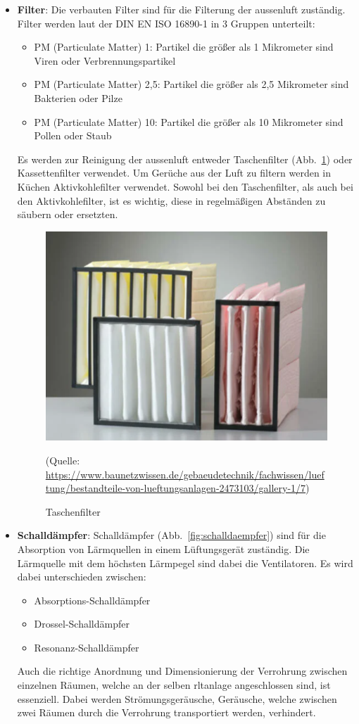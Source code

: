 \begin{itemize}
\item \textbf{Filter}: Die verbauten Filter sind für die Filterung der \gls{aussenluft} zuständig. Filter werden laut der DIN EN ISO 16890-1 in 3 Gruppen unterteilt:
\begin{itemize}
	\item PM (Particulate Matter) 1: Partikel die größer als 1 Mikrometer sind \zB Viren oder Verbrennungspartikel 
	\item PM (Particulate Matter) 2,5: Partikel die größer als 2,5 Mikrometer sind \zB Bakterien oder Pilze
	\item PM (Particulate Matter) 10: Partikel die größer als 10 Mikrometer sind \zB Pollen oder Staub
\end{itemize}
Es werden zur Reinigung der \gls{aussenluft} entweder Taschenfilter (Abb.~\ref{fig:taschenfilter}) oder Kassettenfilter verwendet. Um Gerüche aus der Luft zu filtern \zB werden in Küchen Aktivkohlefilter verwendet. Sowohl bei den Taschenfilter, als auch bei den Aktivkohlefilter, ist es wichtig, diese in regelmäßigen Abständen zu säubern oder ersetzten.  

\begin{figure}[H]
	\centering
	\includegraphics[width=0.4\linewidth]{Bilder/normalefilter}
	\caption{Taschenfilter} 
	(Quelle: \url{	https://www.baunetzwissen.de/gebaeudetechnik/fachwissen/lueftung/bestandteile-von-lueftungsanlagen-2473103/gallery-1/7})
	\label{fig:taschenfilter}
\end{figure}

	\item \textbf{Schalldämpfer}: Schalldämpfer (Abb.~\ref{fig:schalldaempfer}) sind für die Absorption von Lärmquellen in einem Lüftungsgerät zuständig. Die Lärmquelle mit dem höchsten Lärmpegel sind dabei die Ventilatoren. Es wird dabei unterschieden zwischen:
\begin{itemize}
	\item Absorptions-Schalldämpfer 
	\item Drossel-Schalldämpfer
	\item Resonanz-Schalldämpfer
\end{itemize} 
	Auch die richtige Anordnung und Dimensionierung der Verrohrung zwischen einzelnen Räumen, welche an der selben \ac{rltanlage} angeschlossen sind, ist essenziell. Dabei werden Strömungsgeräusche, Geräusche, welche zwischen zwei Räumen durch die Verrohrung transportiert werden, verhindert.


\end{itemize}
